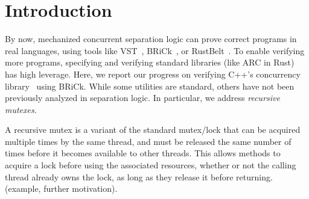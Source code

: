 \documentclass[sigplan,screen]{acmart}
\begin{document}


\maketitle

\section{Introduction}
By now, mechanized concurrent separation logic can prove correct programs in real languages, using tools like VST~\cite{vst}, BRiCk~\cite{brick}, or RustBelt~\cite{rustbelt}.
To enable verifying more programs, specifying and verifying standard libraries (like ARC in Rust) has high leverage.
Here, we report our progress on verifying C++'s concurrency library~\cite{} using BRiCk. While some utilities are standard, others have not been previously analyzed in separation logic. In particular, we address \emph{recursive mutexes}.

A recursive mutex is a variant of the standard mutex/lock that can be acquired multiple times by the same thread, and must be released the same number of times before it becomes available to other threads. This allows methods to acquire a lock before using the associated resources, whether or not the calling thread already owns the lock, as long as they release it before returning. (example, further motivation).
\end{document}

